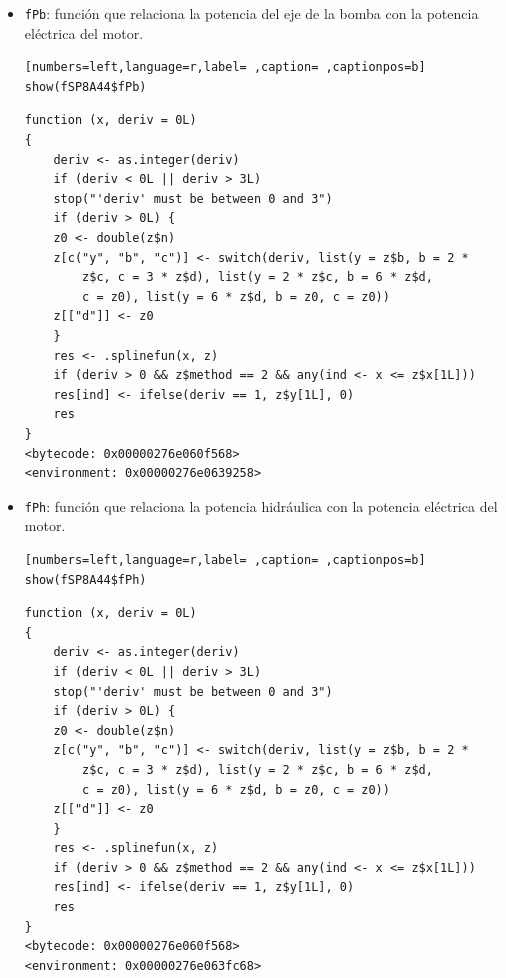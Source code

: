 \begin{itemize}
\begin{itemize}
\begin{verbatim}
function (x, deriv = 0L) 
{
    deriv <- as.integer(deriv)
    if (deriv < 0L || deriv > 3L) 
	stop("'deriv' must be between 0 and 3")
    if (deriv > 0L) {
	z0 <- double(z$n)
	z[c("y", "b", "c")] <- switch(deriv, list(y = z$b, b = 2 * 
	    z$c, c = 3 * z$d), list(y = 2 * z$c, b = 6 * z$d, 
	    c = z0), list(y = 6 * z$d, b = z0, c = z0))
	z[["d"]] <- z0
    }
    res <- .splinefun(x, z)
    if (deriv > 0 && z$method == 2 && any(ind <- x <= z$x[1L])) 
	res[ind] <- ifelse(deriv == 1, z$y[1L], 0)
    res
}
<bytecode: 0x00000276e060f568>
<environment: 0x00000276e060c500>
\end{verbatim}

\item \texttt{fPb}: función que relaciona la potencia del eje de la bomba con la potencia eléctrica del motor.
\begin{lstlisting}[numbers=left,language=r,label= ,caption= ,captionpos=b]
show(fSP8A44$fPb)
\end{lstlisting}

\begin{verbatim}
function (x, deriv = 0L) 
{
    deriv <- as.integer(deriv)
    if (deriv < 0L || deriv > 3L) 
	stop("'deriv' must be between 0 and 3")
    if (deriv > 0L) {
	z0 <- double(z$n)
	z[c("y", "b", "c")] <- switch(deriv, list(y = z$b, b = 2 * 
	    z$c, c = 3 * z$d), list(y = 2 * z$c, b = 6 * z$d, 
	    c = z0), list(y = 6 * z$d, b = z0, c = z0))
	z[["d"]] <- z0
    }
    res <- .splinefun(x, z)
    if (deriv > 0 && z$method == 2 && any(ind <- x <= z$x[1L])) 
	res[ind] <- ifelse(deriv == 1, z$y[1L], 0)
    res
}
<bytecode: 0x00000276e060f568>
<environment: 0x00000276e0639258>
\end{verbatim}

\item \texttt{fPh}: función que relaciona la potencia hidráulica con la potencia eléctrica del motor.
\begin{lstlisting}[numbers=left,language=r,label= ,caption= ,captionpos=b]
show(fSP8A44$fPh)
\end{lstlisting}

\begin{verbatim}
function (x, deriv = 0L) 
{
    deriv <- as.integer(deriv)
    if (deriv < 0L || deriv > 3L) 
	stop("'deriv' must be between 0 and 3")
    if (deriv > 0L) {
	z0 <- double(z$n)
	z[c("y", "b", "c")] <- switch(deriv, list(y = z$b, b = 2 * 
	    z$c, c = 3 * z$d), list(y = 2 * z$c, b = 6 * z$d, 
	    c = z0), list(y = 6 * z$d, b = z0, c = z0))
	z[["d"]] <- z0
    }
    res <- .splinefun(x, z)
    if (deriv > 0 && z$method == 2 && any(ind <- x <= z$x[1L])) 
	res[ind] <- ifelse(deriv == 1, z$y[1L], 0)
    res
}
<bytecode: 0x00000276e060f568>
<environment: 0x00000276e063fc68>
\end{verbatim}


\end{itemize}
\end{itemize}
